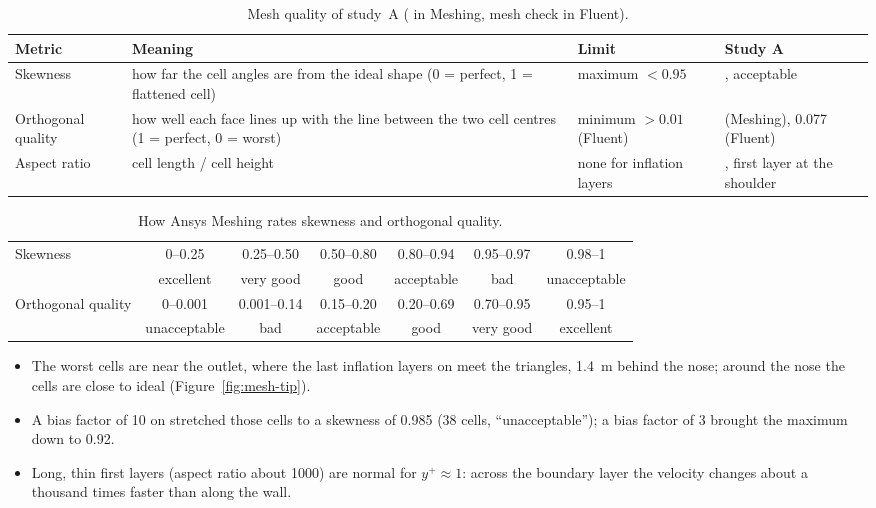 \begin{table}[H]
\centering
\caption{Mesh quality of study~A (\then{}\then{} in Meshing, mesh check in Fluent).}
\label{tab:quality}
\small
\begin{tabularx}{\linewidth}{@{}l>{\raggedright\arraybackslash}X>{\raggedright\arraybackslash}p{2.3cm}>{\raggedright\arraybackslash}p{3.3cm}@{}}
\toprule
Metric & Meaning & Limit & Study A \\
\midrule
Skewness & how far the cell angles are from the ideal shape (0 = perfect, 1 = flattened cell) & maximum $< 0.95$ & 0.92, acceptable \\
Orthogonal quality & how well each face lines up with the line between the two cell centres (1 = perfect, 0 = worst) & minimum $> 0.01$ (Fluent) & 0.237 (Meshing), 0.077 (Fluent) \\
Aspect ratio & cell length / cell height & none for inflation layers & 1660, first layer at the shoulder \\
\bottomrule
\end{tabularx}
\end{table}

\begin{table}[H]
\centering
\caption{How Ansys Meshing rates skewness and orthogonal quality.}
\label{tab:bands}
\small
\begin{tabular}{@{}lcccccc@{}}
\toprule
Skewness & 0--0.25 & 0.25--0.50 & 0.50--0.80 & 0.80--0.94 & 0.95--0.97 & 0.98--1 \\
 & excellent & very good & good & acceptable & bad & unacceptable \\
\midrule
Orthogonal quality & 0--0.001 & 0.001--0.14 & 0.15--0.20 & 0.20--0.69 & 0.70--0.95 & 0.95--1 \\
 & unacceptable & bad & acceptable & good & very good & excellent \\
\bottomrule
\end{tabular}
\end{table}

\begin{itemize}
\item The worst cells are near the outlet, where the last inflation layers on  meet the
triangles, \SI{1.4}{m} behind the nose; around the nose the cells are close to ideal
(Figure~\ref{fig:mesh-tip}).
\item A bias factor of 10 on  stretched those cells to a skewness of 0.985 (38 cells,
``unacceptable''); a bias factor of 3 brought the maximum down to 0.92.
\item Long, thin first layers (aspect ratio about 1000) are normal for $y^+ \approx 1$: across the
boundary layer the velocity changes about a thousand times faster than along the wall.
\end{itemize}

